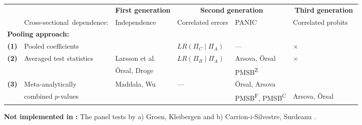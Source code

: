 
\begin{threeparttable}
	\begin{tabular}{ll|l|ll|ll}
		\hline\hline
		&  & \multicolumn{1}{|c|}{ \textbf{First generation} } & \multicolumn{2}{|c}{ \textbf{Second generation} } & \multicolumn{2}{|c}{ \textbf{Third generation} }  \\
		& \hfill \mbox{Cross-sectional dependence:} & Independence & Correlated errors & PANIC \citeyearpar{BaiNg2004} & Correlated probits & \\ 
		\multicolumn{2}{l|}{ \textbf{Pooling approach:} } &  &  &  &  & \\ 
		\hline
		\textbf{(1)} & Pooled coefficients & \citet{Breitung2005} & \tnote{a)}\quad $ LR(\Pi_C \mid \Pi_A) $ & --- & $ \times $ & \\[7pt]
		\textbf{(2)} & Averaged test statistics & Larsson et al.~\citeyearpar{LarssonEtAl2001} &  \tnote{a)}\quad $ LR(\Pi_B \mid \Pi_A) $  & Arsova, Örsal \citeyearpar{ArsovaOersal2018} & $ \times $  & \\
		&  & Örsal, Droge \citeyearpar{OersalDroge2014} &  & \tnote{b)}\quad PMSB\textsuperscript{Z} &  & \\[7pt]
		\textbf{(3)} & Meta-analytically & Maddala, Wu \citeyearpar{MaddalaWu1999} & \quad --- & Örsal, Arsova \citeyearpar{OersalArsova2017} & \citet{Hartung1999} &  \\
		&  combined $p$-values & \citet{Choi2001} &   & \tnote{b)}\quad PMSB\textsuperscript{F}, PMSB\textsuperscript{C}  & Arsova, Örsal \citeyearpar{ArsovaOersal2021} &  \\ 
		\hline\hline
	\end{tabular}
	\begin{tablenotes}
		\item \normalsize{\textbf{Not implemented in :} The panel tests by a) Groen, Kleibergen \citeyearpar{GroenFrank2003} and b) Carrion-i-Silvestre, Surdeanu \citeyearpar{SilvestreSurdeanu2011}.}
	\end{tablenotes}
\end{threeparttable}